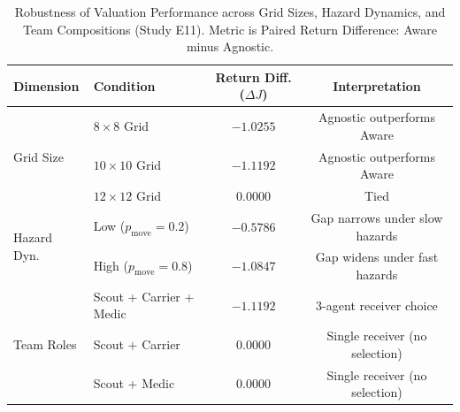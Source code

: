 \begin{table}[t]
\centering
\small
\caption{Robustness of Valuation Performance across Grid Sizes, Hazard Dynamics, and Team Compositions (Study E11). Metric is Paired Return Difference: Aware minus Agnostic.}
\label{tab:robustness}
\begin{tabular}{llcc}
\toprule
Dimension & Condition & Return Diff. ($\Delta J$) & Interpretation \\
\midrule
\multirow{3}{*}{Grid Size} & $8\times 8$ Grid   & $-1.0255$ & Agnostic outperforms Aware \\
                           & $10\times 10$ Grid & $-1.1192$ & Agnostic outperforms Aware \\
                           & $12\times 12$ Grid & \phantom{$-$}0.0000 & Tied \\
\midrule
\multirow{2}{*}{Hazard Dyn.} & Low ($p_{\mathrm{move}}=0.2$)  & $-0.5786$ & Gap narrows under slow hazards \\
                             & High ($p_{\mathrm{move}}=0.8$) & $-1.0847$ & Gap widens under fast hazards \\
\midrule
\multirow{3}{*}{Team Roles}  & Scout + Carrier + Medic & $-1.1192$ & 3-agent receiver choice \\
                             & Scout + Carrier & \phantom{$-$}0.0000 & Single receiver (no selection) \\
                             & Scout + Medic   & \phantom{$-$}0.0000 & Single receiver (no selection) \\
\bottomrule
\end{tabular}
\end{table}
